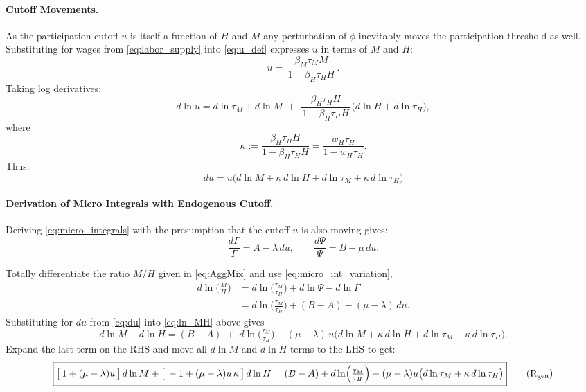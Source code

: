 \documentclass[english]{article}
\begin{document}
\paragraph{Cutoff Movements.}
As the participation cutoff $u$ is itself a function of $H$ and $M$ any perturbation of $\phi$ inevitably moves the participation threshold as well.
Substituting for wages from \eqref{eq:labor_supply} into \eqref{eq:u_def} expresses $u$ in terms of $M$ and $H$:
\[
u=\dfrac{\beta_M\tau_M M}{\,1-\beta_H\tau_H H\,}.
\]
Taking log derivatives:
\[
d\ln u
= d\ln \tau_M + d\ln M \;+\; \frac{\beta_H\tau_H H}{\,1-\beta_H\tau_H H\,}\Big(d\ln H + d\ln \tau_H\Big),
\]
where
\begin{equation}
\kappa:=\frac{\beta_H\tau_H H}{1-\beta_H\tau_H H}=\frac{w_H\tau_H}{1-w_H\tau_H}. \label{eq:kappa}
\end{equation}
Thus:
\begin{equation}
\boxed{
du = u\Big(d\ln M + \kappa\,d\ln H + d\ln \tau_M + \kappa\,d\ln \tau_H\Big)}
\label{eq:du}
\end{equation}

\paragraph{Derivation of Micro Integrals with Endogenous Cutoff.}
Deriving \eqref{eq:micro_integrals} with the presumption that the cutoff $u$ is also moving gives:
\begin{equation}
\frac{d\Gamma}{\Gamma}=A-\lambda\,du,
\qquad
\frac{d\Psi}{\Psi}=B-\mu\,du.\label{eq:micro_int_variation}
\end{equation}

Totally differentiate the ratio $M/H$ given in \eqref{eq:AggMix} and use \eqref{eq:micro_int_variation},
\begin{align}
d\ln\!\Big(\frac{M}{H}\Big)
&= d\ln\!\Big(\frac{\tau_M}{\tau_H}\Big) + d\ln\Psi - d\ln\Gamma  \nonumber
\\ 
&= d\ln\!\Big(\frac{\tau_M}{\tau_H}\Big)
+ (B-A) - (\mu-\lambda)\,du.\label{eq:ln_MH}
\end{align}
Substituting for $du$ from \eqref{eq:du} into \eqref{eq:ln_MH} above gives
\[
d\ln M - d\ln H
= (B-A) \;+\; d\ln\!\Big(\tfrac{\tau_M}{\tau_H}\Big) - (\mu-\lambda)\, u\Big(d\ln M + \kappa\,d\ln H + d\ln \tau_M + \kappa\,d\ln \tau_H\Big).
\]
Expand the last term on the RHS and move all $d\ln M$ and $d\ln H$ terms to the LHS to get:
\begin{equation}
\boxed{
\big[\,1 + (\mu-\lambda)u\,\big]\,d\ln M
+ \big[\, -1 + (\mu-\lambda)u\,\kappa\,\big]\,d\ln H
=
(B-A) + d\ln\!\Big(\tfrac{\tau_M}{\tau_H}\Big)
 - (\mu-\lambda)u\big(d\ln \tau_M + \kappa\,d\ln \tau_H\big)
}
\tag{$\mathrm{R}_{\mathrm{gen}}$}\label{eq:Rgen}
\end{equation}
\end{document}
